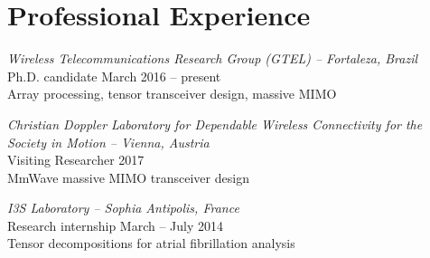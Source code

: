 \section{Professional Experience}

{\sl Wireless Telecommunications Research Group (GTEL) -- Fortaleza, Brazil}\\
Ph.D. candidate \hfill March 2016 -- present \\
Array processing, tensor transceiver design, massive MIMO

{\sl Christian Doppler Laboratory for Dependable Wireless Connectivity for the Society in Motion -- Vienna, Austria}\\
Visiting Researcher \hfill 2017 \\
MmWave massive MIMO transceiver design

{\sl I3S Laboratory -- Sophia Antipolis, France}\\
Research internship \hfill  March -- July 2014 \\
Tensor decompositions for atrial fibrillation analysis